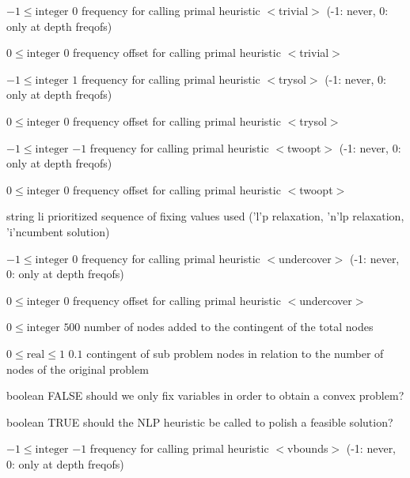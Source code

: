 %
{$-1\leq\textrm{integer}$}%
{$0$}%
{frequency for calling primal heuristic $<$trivial$>$ (-1: never, 0: only at depth freqofs)}%
{}

%
{$0\leq\textrm{integer}$}%
{$0$}%
{frequency offset for calling primal heuristic $<$trivial$>$}%
{}

%
{$-1\leq\textrm{integer}$}%
{$1$}%
{frequency for calling primal heuristic $<$trysol$>$ (-1: never, 0: only at depth freqofs)}%
{}

%
{$0\leq\textrm{integer}$}%
{$0$}%
{frequency offset for calling primal heuristic $<$trysol$>$}%
{}

%
{$-1\leq\textrm{integer}$}%
{$-1$}%
{frequency for calling primal heuristic $<$twoopt$>$ (-1: never, 0: only at depth freqofs)}%
{}

%
{$0\leq\textrm{integer}$}%
{$0$}%
{frequency offset for calling primal heuristic $<$twoopt$>$}%
{}

%
{string}%
{li}%
{prioritized sequence of fixing values used ('l'p relaxation, 'n'lp relaxation, 'i'ncumbent solution)}%
{}

%
{$-1\leq\textrm{integer}$}%
{$0$}%
{frequency for calling primal heuristic $<$undercover$>$ (-1: never, 0: only at depth freqofs)}%
{}

%
{$0\leq\textrm{integer}$}%
{$0$}%
{frequency offset for calling primal heuristic $<$undercover$>$}%
{}

%
{$0\leq\textrm{integer}$}%
{$500$}%
{number of nodes added to the contingent of the total nodes}%
{}

%
{$0\leq\textrm{real}\leq1$}%
{$0.1$}%
{contingent of sub problem nodes in relation to the number of nodes of the original problem}%
{}

%
{boolean}%
{FALSE}%
{should we only fix variables in order to obtain a convex problem?}%
{}

%
{boolean}%
{TRUE}%
{should the NLP heuristic be called to polish a feasible solution?}%
{}

%
{$-1\leq\textrm{integer}$}%
{$-1$}%
{frequency for calling primal heuristic $<$vbounds$>$ (-1: never, 0: only at depth freqofs)}%
{}

